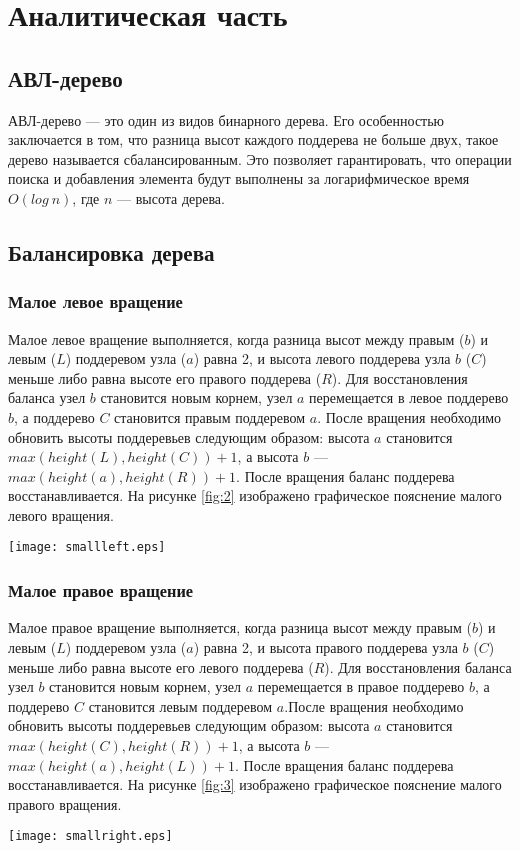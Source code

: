 \chapter{Аналитическая часть}

\section{АВЛ-дерево}
АВЛ-дерево --- это один из видов бинарного дерева. Его особенностью заключается в том, что разница высот каждого поддерева не больше двух, такое дерево называется сбалансированным. Это позволяет гарантировать, что операции поиска и добавления элемента будут выполнены за логарифмическое время $O(log \ n)$, где $n$ --- высота дерева.

\section{Балансировка дерева}
\subsection{Малое левое вращение}
Малое левое вращение выполняется, когда разница высот между правым ($b$) и левым ($L$) поддеревом узла ($a$) равна 2, и высота левого поддерева узла $b$ ($C$) меньше либо равна высоте его правого поддерева ($R$). Для восстановления баланса узел $b$ становится новым корнем, узел $a$ перемещается в левое поддерево $b$, а поддерево $C$ становится правым поддеревом $a$. После вращения необходимо обновить высоты поддеревьев следующим образом: высота $a$ становится $max (height(L), height(C)) + 1$, а высота $b$ --- $max (height(a), height(R)) + 1$. После вращения баланс поддерева восстанавливается. На рисунке \ref{fig:2} изображено графическое пояснение малого левого вращения.
\begin{center}
	\texttt{[image: smallleft.eps]}
	\label{fig:2}
\end{center}


\subsection{Малое правое вращение}
Малое правое вращение  выполняется, когда разница высот между правым ($b$) и левым ($L$) поддеревом узла ($a$) равна 2, и высота правого поддерева узла $b$ ($C$) меньше либо равна высоте его левого поддерева ($R$). Для восстановления баланса узел $b$ становится новым корнем, узел $a$ перемещается в правое поддерево $b$, а поддерево $C$ становится левым поддеревом $a$.После вращения необходимо обновить высоты поддеревьев следующим образом: высота $a$ становится $max (height(C), height(R)) + 1$, а высота $b$ --- $max (height(a), height(L)) + 1$. После вращения баланс поддерева восстанавливается. На рисунке \ref{fig:3} изображено графическое пояснение малого правого вращения.
\begin{center}
	\texttt{[image: smallright.eps]}
	\label{fig:3}
\end{center}

